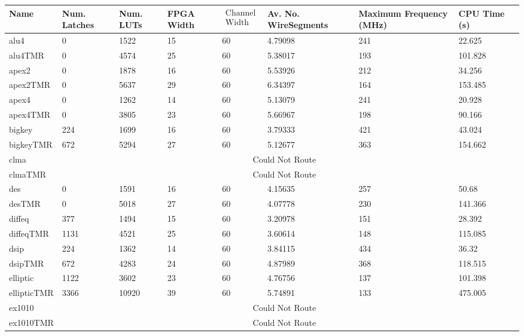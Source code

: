 \documentclass[12pt,final,oneside]{memoir} %
\begin{document}
\begin{table}
\footnotesize
\begin{adjustwidth}{-1cm}{-1.2cm}
    \begin{tabularx}{1.1\textwidth}{XXXXlXXXX}
    \toprule
Name & Num. Latches & Num. LUTs & FPGA Width & $\begin{matrix}\text{Channel}\\\text{Width}\end{matrix}$ & Av. No. Wire\newline Segments & Maximum Frequency (MHz) & CPU Time (s)\\\midrule
alu4 & 0 & 1522 & 15 & 60 & 4.79098 & 241 & 22.625\\
alu4TMR & 0 & 4574 & 25 & 60 & 5.38017 & 193 & 101.828\\\midrule
apex2 & 0 & 1878 & 16 & 60 & 5.53926 & 212 & 34.256\\
apex2TMR & 0 & 5637 & 29 & 60 & 6.34397 & 164 & 153.485\\\midrule
apex4 & 0 & 1262 & 14 & 60 & 5.13079 & 241 & 20.928\\
apex4TMR & 0 & 3805 & 23 & 60 & 5.66967 & 198 & 90.166\\\midrule
bigkey & 224 & 1699 & 16 & 60 & 3.79333 & 421 & 43.024\\
bigkeyTMR & 672 & 5294 & 27 & 60 & 5.12677 & 363 & 154.662\\\midrule
clma & \multicolumn{7}{c}{Could Not Route}\\
clmaTMR & \multicolumn{7}{c}{Could Not Route}\\\midrule
des & 0 & 1591 & 16 & 60 & 4.15635 & 257 & 50.68\\
desTMR & 0 & 5018 & 27 & 60 & 4.07778 & 230 & 141.366\\\midrule
diffeq & 377 & 1494 & 15 & 60 & 3.20978 & 151 & 28.392\\
diffeqTMR & 1131 & 4521 & 25 & 60 & 3.60614 & 148 & 115.085\\\midrule
dsip & 224 & 1362 & 14 & 60 & 3.84115 & 434 & 36.32\\
dsipTMR & 672 & 4283 & 24 & 60 & 4.87989 & 368 & 118.515\\\midrule
elliptic & 1122 & 3602 & 23 & 60 & 4.76756 & 137 & 101.398\\
ellipticTMR & 3366 & 10920 & 39 & 60 & 5.74891 & 133 & 475.005\\\midrule
ex1010 & \multicolumn{7}{c}{Could Not Route}\\
ex1010TMR & \multicolumn{7}{c}{Could Not Route}\\\midrule

\end{tabularx}
\end{adjustwidth}
\end{table}
\end{document}
